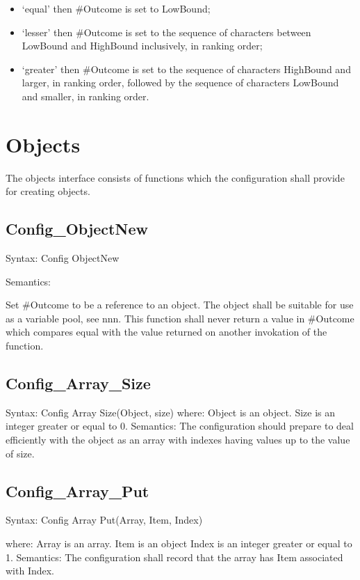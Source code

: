 \begin{itemize}
\item
  `equal' then \#Outcome is set to LowBound;
\item
  `lesser' then \#Outcome is set to the sequence of characters between
  LowBound and HighBound inclusively, in ranking order;
\item
  `greater' then \#Outcome is set to the sequence of characters
  HighBound and larger, in ranking order, followed by the sequence of
  characters LowBound and smaller, in ranking order.
\end{itemize}

\section{Objects}\label{objects}

The objects interface consists of functions which the configuration
shall provide for creating objects.

\subsection{Config\_ObjectNew}\label{config_objectnew}

Syntax: Config ObjectNew

Semantics:

Set \#Outcome to be a reference to an object. The object shall be
suitable for use as a variable pool, see nnn. This function shall never
return a value in \#Outcome which compares equal with the value returned
on another invokation of the function.

\subsection{Config\_Array\_Size}\label{config_array_size}

Syntax: Config Array Size(Object, size) where: Object is an object. Size
is an integer greater or equal to 0. Semantics: The configuration should
prepare to deal efficiently with the object as an array with indexes
having values up to the value of size.

\subsection{Config\_Array\_Put}\label{config_array_put}

Syntax: Config Array Put(Array, Item, Index)

where: Array is an array. Item is an object Index is an integer greater
or equal to 1. Semantics: The configuration shall record that the array
has Item associated with Index.

